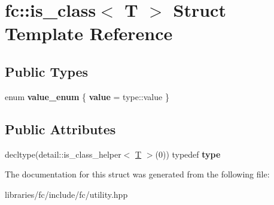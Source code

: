\hypertarget{structfc_1_1is__class}{}\section{fc\+:\+:is\+\_\+class$<$ T $>$ Struct Template Reference}
\label{structfc_1_1is__class}
\subsection*{Public Types}
\begin{DoxyCompactItemize}
\item 
\mbox{\label{structfc_1_1is__class_a4ff4c2eb84f0d144fd0a8a3d761fefc1}} 
enum {\bfseries value\+\_\+enum} \{ {\bfseries value} = type\+:\+:value
 \}
\end{DoxyCompactItemize}
\subsection*{Public Attributes}
\begin{DoxyCompactItemize}
\item 
\mbox{\label{structfc_1_1is__class_a2bac01d0d47930c24d8971f0244a92ca}} 
decltype(detail\+::is\+\_\+class\+\_\+helper$<$ \mbox{\hyperlink{struct_t}{T}} $>$(0)) typedef {\bfseries type}
\end{DoxyCompactItemize}


The documentation for this struct was generated from the following file\+:\begin{DoxyCompactItemize}
\item 
libraries/fc/include/fc/utility.\+hpp\end{DoxyCompactItemize}
